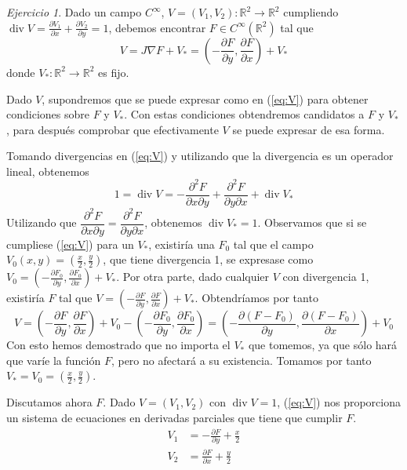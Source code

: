 \documentclass[12pt,spanish]{article}
\theoremstyle{definition}
\theoremstyle{remark}
\newtheorem{exercise}{Ejercicio}
\begin{document}
\newpage
\setcounter{exercise}{10}
\begin{exercise}
  Dado un campo $C^\infty$,
  $V=(V_1,V_2):\mathbb{R}^2\rightarrow\mathbb{R}^2$ cumpliendo
  $\operatorname{div}V=\frac{\partial V_1}{\partial x}+\frac{\partial
    V_2}{\partial y}=1$, debemos encontrar $F\in C^\infty(\mathbb{R}^2)$
  tal que
  \begin{equation} \label{eq:V}
    V=J\nabla F+V_*=\left(-\frac{\partial F}{\partial y},\frac{\partial F}{\partial x}\right)+V_*
  \end{equation} 
  donde $V_*:\mathbb{R}^2\rightarrow\mathbb{R}^2$ es fijo.

  Dado $V$, supondremos que se puede expresar como en (\ref{eq:V})
  para obtener condiciones sobre $F$ y $V_*$. Con estas condiciones
  obtendremos candidatos a $F$ y $V_*$, para después comprobar que
  efectivamente $V$ se puede expresar de esa forma.

  Tomando divergencias en (\ref{eq:V}) y utilizando que la divergencia
es un operador lineal, obtenemos
\[1=\operatorname{div}V = -\frac{\partial^2 F}{\partial x\partial
    y}+\frac{\partial^2 F}{\partial y\partial
    x}+\operatorname{div}V_*\] Utilizando que
$\dfrac{\partial^2 F}{\partial x\partial y}=\dfrac{\partial^2
  F}{\partial y\partial x}$, obtenemos
$\operatorname{div}V_*=1$. Observamos que si se cumpliese (\ref{eq:V})
para un $V_*$, existiría una $F_0$ tal que el campo
$V_0(x,y)=(\frac{x}{2},\frac{y}{2})$, que tiene divergencia 1, se
expresase como
$V_0=\left(-\frac{\partial F_0}{\partial y},\frac{\partial
    F_0}{\partial x}\right)+V_*$. Por otra parte, dado cualquier $V$
con divergencia 1, existiría $F$ tal que
$V=\left(-\frac{\partial F}{\partial y},\frac{\partial F}{\partial
    x}\right)+V_*$. Obtendríamos por tanto
\[V=\left(-\frac{\partial F}{\partial y},\frac{\partial F}{\partial
      x}\right)+V_0-\left(-\frac{\partial F_0}{\partial
      y},\frac{\partial F_0}{\partial x}\right)=\left(-\frac{\partial
      (F-F_0)}{\partial y},\frac{\partial (F-F_0)}{\partial
      x}\right)+V_0\] Con esto hemos demostrado que no importa el
$V_*$ que tomemos, ya que sólo hará que varíe la función $F$, pero no
afectará a su existencia. Tomamos por tanto
$V_*=V_0=(\frac{x}{2},\frac{y}{2})$.

Discutamos ahora $F$. Dado $V=(V_1,V_2)$ con $\operatorname{div}V=1$,
(\ref{eq:V}) nos proporciona un sistema de ecuaciones en derivadas
parciales que tiene que cumplir $F$.
\begin{align} 
   V_1&=-\frac{\partial F}{\partial y}+\frac{x}{2} \label{eq:dy}\\
   V_2&=\frac{\partial F}{\partial x}+\frac{y}{2} \label{eq:dx}
\end{align}


\end{exercise}
\end{document}
